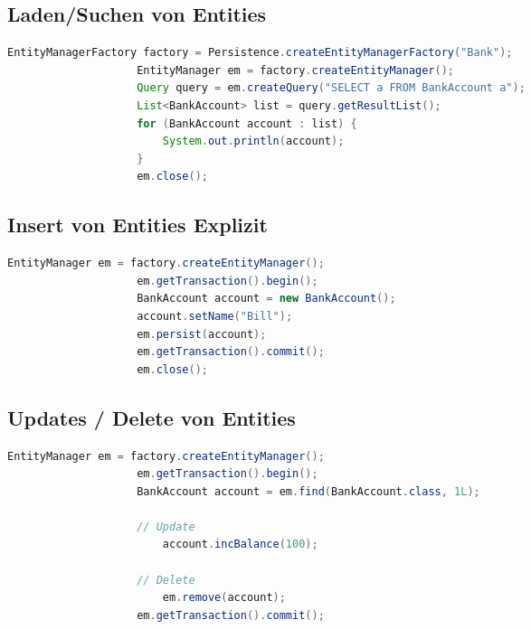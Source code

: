\documentclass[a4paper, landscape, 8pt]{scrartcl}
\begin{document}
\begin{multicols*}{4}
        \subsection{Laden/Suchen von Entities}
        \begin{lstlisting}[language=java]
                    EntityManagerFactory factory = Persistence.createEntityManagerFactory("Bank");
                    EntityManager em = factory.createEntityManager();
                    Query query = em.createQuery("SELECT a FROM BankAccount a");
                    List<BankAccount> list = query.getResultList();
                    for (BankAccount account : list) {
                        System.out.println(account);
                    }
                    em.close();
        \end{lstlisting}

        \subsection{Insert von Entities \tiny{Explizit}}
        \begin{lstlisting}[language=java]
                    EntityManager em = factory.createEntityManager();
                    em.getTransaction().begin();
                    BankAccount account = new BankAccount();
                    account.setName("Bill");
                    em.persist(account);
                    em.getTransaction().commit();
                    em.close();
        \end{lstlisting}

        \subsection{Updates / Delete von Entities}
        \begin{lstlisting}[language=java]
                    EntityManager em = factory.createEntityManager();
                    em.getTransaction().begin();
                    BankAccount account = em.find(BankAccount.class, 1L);

                    // Update
                        account.incBalance(100);

                    // Delete
                        em.remove(account);
                    em.getTransaction().commit();
        \end{lstlisting}


\end{multicols*}
\end{document}

